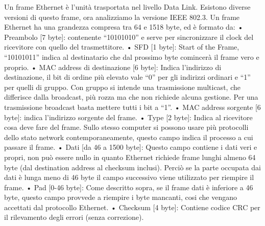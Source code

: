 Un frame Ethernet è l’unità trasportata nel livello Data Link.
Esistono diverse versioni di questo frame, ora analizziamo la versione IEEE 802.3. 
Un frame Ethernet ha una grandezza compresa tra 64 e 1518 byte, ed è formato da:
•	Preambolo [7 byte]: contenente “10101010” e serve per sincronizzare il clock del ricevitore con quello del trasmettitore.
•	SFD [1 byte]: Start of the Frame, “10101011” indica al destinatario che dal prossimo byte comincerà il frame vero e proprio.
•	MAC address di destinazione [6 byte]: Indica l’indirizzo di destinazione, il bit di ordine più elevato vale “0” per gli indirizzi ordinari e “1” per quelli di gruppo. Con gruppo si intende una trasmissione multicast, che differisce dalla broadcast, più rozza ma che non richiede alcuna gestione. Per una trasmissione broadcast basta mettere tutti i bit a “1”.
•	MAC address sorgente [6 byte]: indica l’indirizzo sorgente del frame.
•	Type [2 byte]: Indica al ricevitore cosa deve fare del frame. Sullo stesso computer si possono usare più protocolli dello stato network contemporaneamente, questo campo indica il processo a cui passare il frame.
•	Dati [da 46 a 1500 byte]: Questo campo contiene i dati veri e propri, non può essere nullo in quanto Ethernet richiede frame lunghi almeno 64 byte (dal destination address al checksum inclusi). Perciò se la parte occupata dai dati è lunga meno di 46 byte il campo successivo viene utilizzato per riempire il frame.
•	Pad [0-46 byte]: Come descritto sopra, se il frame dati è inferiore a 46 byte, questo campo provvede a riempire i byte mancanti, cosi che vengano accettati dal protocollo Ethernet.
•	Checksum [4 byte]: Contiene codice CRC per il rilevamento degli errori (senza correzione).

 

